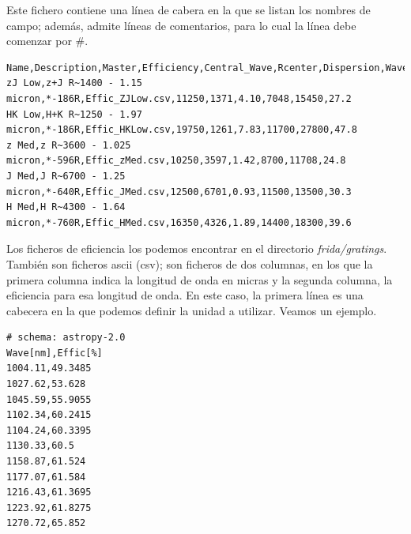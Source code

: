     Este fichero contiene una l\'inea de cabera en la que se listan los nombres de campo; adem\'as, admite l\'ineas de comentarios, para lo cual la l\'inea debe comenzar por \#.

\begin{Verbatim}[fontsize=\scriptsize]
Name,Description,Master,Efficiency,Central_Wave,Rcenter,Dispersion,Wave_ini,Wave_end,diff_limit
zJ Low,z+J R~1400 - 1.15 micron,*-186R,Effic_ZJLow.csv,11250,1371,4.10,7048,15450,27.2
HK Low,H+K R~1250 - 1.97 micron,*-186R,Effic_HKLow.csv,19750,1261,7.83,11700,27800,47.8
z Med,z R~3600 - 1.025 micron,*-596R,Effic_zMed.csv,10250,3597,1.42,8700,11708,24.8
J Med,J R~6700 - 1.25 micron,*-640R,Effic_JMed.csv,12500,6701,0.93,11500,13500,30.3
H Med,H R~4300 - 1.64 micron,*-760R,Effic_HMed.csv,16350,4326,1.89,14400,18300,39.6
\end{Verbatim}

    Los ficheros de eficiencia los podemos encontrar en el directorio \textit{frida/gratings}. Tambi\'en son ficheros ascii (csv); son ficheros de dos columnas, en los que la primera columna indica la longitud de onda en micras y la segunda columna, la eficiencia para esa longitud de onda. En este caso, la primera l\'inea es una cabecera en la que podemos definir la unidad a utilizar. Veamos un ejemplo.
\begin{Verbatim}[fontsize=\scriptsize]
# schema: astropy-2.0
Wave[nm],Effic[%]
1004.11,49.3485
1027.62,53.628
1045.59,55.9055
1102.34,60.2415
1104.24,60.3395
1130.33,60.5
1158.87,61.524
1177.07,61.584
1216.43,61.3695
1223.92,61.8275
1270.72,65.852
\end{Verbatim}





